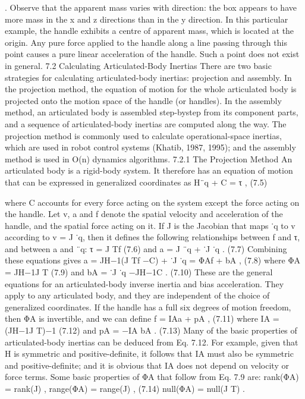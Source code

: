 . Observe that the apparent mass varies with direction: the box appears to have more mass in the x and z directions than in the y direction. In this particular example, the handle exhibits a centre of apparent mass, which is located at the origin. Any pure force applied to the handle along a line passing through this point causes a pure linear acceleration of the handle. Such a point does not exist in general. 7.2 Calculating Articulated-Body Inertias There are two basic strategies for calculating articulated-body inertias: projection and assembly. In the projection method, the equation of motion for the whole articulated body is projected onto the motion space of the handle (or handles). In the assembly method, an articulated body is assembled step-bystep from its component parts, and a sequence of articulated-body inertias are computed along the way. The projection method is commonly used to calculate operational-space inertias, which are used in robot control systems (Khatib, 1987, 1995); and the assembly method is used in O(n) dynamics algorithms. 7.2.1 The Projection Method An articulated body is a rigid-body system. It therefore has an equation of motion that can be expressed in generalized coordinates as H¨q + C = τ , (7.5)

where C accounts for every force acting on the system except the force acting on the handle. Let v, a and f denote the spatial velocity and acceleration of the handle, and the spatial force acting on it. If J is the Jacobian that maps ˙q to v according to v = J ˙q, then it defines the following relationships between f and τ, and between a and ¨q: τ = J Tf (7.6) and a = J ¨q + ˙J ˙q . (7.7) Combining these equations gives a = JH−1(J Tf −C) + ˙J ˙q = ΦAf + bA , (7.8) where ΦA = JH−1J T (7.9) and bA = ˙J ˙q −JH−1C . (7.10) These are the general equations for an articulated-body inverse inertia and bias acceleration. They apply to any articulated body, and they are independent of the choice of generalized coordinates. If the handle has a full six degrees of motion freedom, then ΦA is invertible, and we can define f = IAa + pA , (7.11) where IA = (JH−1J T)−1 (7.12) and pA = −IA bA . (7.13) Many of the basic properties of articulated-body inertias can be deduced from Eq. 7.12. For example, given that H is symmetric and positive-definite, it follows that IA must also be symmetric and positive-definite; and it is obvious that IA does not depend on velocity or force terms. Some basic properties of ΦA that follow from Eq. 7.9 are: rank(ΦA) = rank(J) , range(ΦA) = range(J) , (7.14) null(ΦA) = null(J T) .

